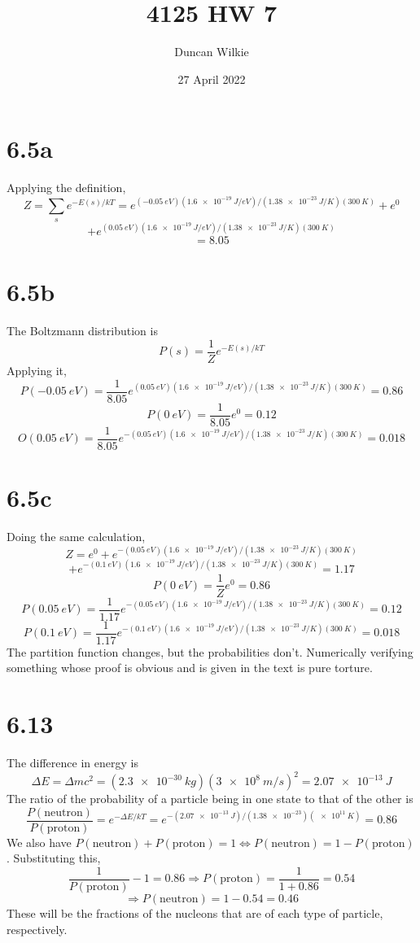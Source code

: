 \documentclass{article}
\title{4125 HW 7}
\author{Duncan Wilkie}
\date{27 April 2022}
\begin{document}
\maketitle

\section*{6.5a}
Applying the definition,
\[
  Z=\sum_{s}e^{-E(s)/kT}=e^{(\SI{-0.05}{eV})(\SI{1.6e-19}{J/eV})/(\SI{1.38e-23}{J/K})(\SI{300}{K})}
  +e^{0}
\]
\[
  +e^{(\SI{0.05}{eV})(\SI{1.6e-19}{J/eV})/(\SI{1.38e-23}{J/K})(\SI{300}{K})}
\]
\[=8.05\]

\section*{6.5b}
The Boltzmann distribution is
\[P(s)=\frac{1}{Z}e^{-E(s)/kT}\]
Applying it,
\[P(\SI{-0.05}{eV})=\frac{1}{8.05}e^{(\SI{0.05}{eV})(\SI{1.6e-19}{J/eV})/(\SI{1.38e-23}{J/K})(\SI{300}{K})}=0.86\]
\[P(\SI{0}{eV})=\frac{1}{8.05}e^{0}=0.12\]
\[O(\SI{0.05}{eV})=\frac{1}{8.05}e^{-(\SI{0.05}{eV})(\SI{1.6e-19}{J/eV})/(\SI{1.38e-23}{J/K})(\SI{300}{K})}=0.018\]

\section*{6.5c}
Doing the same calculation,
\[Z=e^{0}+e^{-(\SI{0.05}{eV})(\SI{1.6e-19}{J/eV})/(\SI{1.38e-23}{J/K})(\SI{300}{K})}\]
\[+e^{-(\SI{0.1}{eV})(\SI{1.6e-19}{J/eV})/(\SI{1.38e-23}{J/K})(\SI{300}{K})}=1.17\]
\[P(\SI{0}{eV})=\frac{1}{Z}e^{0}=0.86\]
\[P(\SI{0.05}{eV})=\frac{1}{1.17}e^{-(\SI{0.05}{eV})(\SI{1.6e-19}{J/eV})/(\SI{1.38e-23}{J/K})(\SI{300}{K})}=0.12\]
\[P(\SI{0.1}{eV})=\frac{1}{1.17}e^{-(\SI{0.1}{eV})(\SI{1.6e-19}{J/eV})/(\SI{1.38e-23}{J/K})(\SI{300}{K})}=0.018\]
The partition function changes, but the probabilities don't.
Numerically verifying something whose proof is obvious and is given in the text is pure torture.

\section*{6.13}
The difference in energy is
\[\Delta E=\Delta m c^{2}=(\SI{2.3e-30}{kg})(\SI{3e8}{m/s})^{2}=\SI{2.07e-13}{J}\]
The ratio of the probability of a particle being in one state to that of the other is
\[\frac{P(\textrm{neutron})}{P(\textrm{proton})}=e^{-\Delta E/kT}=e^{-(\SI{2.07e-13}{J})/(\SI{1.38e-23})(\SI{e11}{K})}=0.86\]
We also have $P(\textrm{neutron})+P(\textrm{proton})=1\Leftrightarrow P(\textrm{neutron})=1-P(\textrm{proton})$.
Substituting this,
\[\frac{1}{P(\textrm{proton})}-1=0.86\Rightarrow P(\textrm{proton})=\frac{1}{1+0.86}=0.54\]
\[\Rightarrow P(\textrm{neutron})=1-0.54=0.46\]
These will be the fractions of the nucleons that are of each type of particle, respectively.
\end{document}
